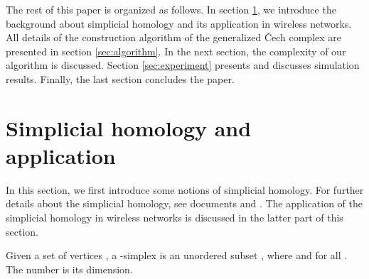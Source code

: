 \documentclass[conference]{IEEEtran}
\begin{document}
The rest of this paper is organized as follows. In section \ref{sec:SimplicialHomology}, we introduce the background about simplicial homology and its application in wireless networks. All details of the construction algorithm of the generalized \v{C}ech complex are presented in section \ref{sec:algorithm}. In the next section, the complexity of our algorithm is discussed. Section \ref{sec:experiment} presents and discusses simulation results. Finally, the last section concludes the paper.\par













































\section{Simplicial homology and application}
\label{sec:SimplicialHomology}
In this section, we first introduce some notions of simplicial homology. For further details about the simplicial homology, see documents \cite{bookMunkres} and
\cite{bookHatcher}. The application of the simplicial homology in wireless networks is discussed in the latter part of this section.

Given a set of vertices , a -simplex is an
unordered subset , where  and
 for all . The number  is its
dimension. 
\end{document}
